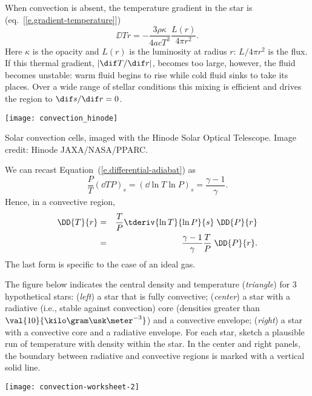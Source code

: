 When convection is absent, the temperature gradient in the star is (eq.~[\ref{e.gradient-temperature}])
\[
    \DD{T}{r} = -\frac{3\rho\kappa}{4acT^3}\frac{L(r)}{4\pi r^2}.
\]
Here $\kappa$ is the opacity and $L(r)$ is the luminosity at radius $r$: $L/4\pi r^2$ is the flux. If this thermal gradient, $|\dif T/\dif r|$, becomes too large, however, the fluid becomes unstable: warm fluid begins to rise while cold fluid sinks to take its places. Over a wide range of stellar conditions this mixing is efficient and drives the region to $\dif s/\dif r = 0$.
\begin{marginfigure}
\texttt{[image: convection\_hinode]}
\caption[Solar convection cells]{\label{f.solar-convection]} Solar convection cells, imaged with the Hinode Solar Optical Telescope. Image credit: Hinode JAXA/NASA/PPARC.}
\end{marginfigure}

We can recast Equation~(\ref{e.differential-adiabat}) as
\begin{equation}
    \frac{P}{T}\left(\dd{T}{P}\right)_s = \left(\dd{\ln T}{\ln P}\right)_s = \frac{\gamma-1}{\gamma}.
\label{e.nabla-adiabat}
\end{equation}
Hence, in a convective region,
\begin{eqnarray}
\DD{T}{r} &=& \frac{T}{P}\tderiv{\ln T}{\ln P}{s}\;\DD{P}{r} \nonumber\\
 &=& \frac{\gamma-1}{\gamma} \frac{T}{P}\; \DD{P}{r}.
\end{eqnarray}
The last form is specific to the case of an ideal gas.

\begin{exercisebox}
The figure below indicates the central density and temperature (\emph{triangle}) for 3 hypothetical stars: (\emph{left}) a star that is fully convective; (\emph{center}) a star with a radiative (i.e., stable against convection) core (densities greater than $\val{10}{\kilo\gram\usk\meter^{-3}}$) and a convective envelope; (\emph{right}) a star with a convective core and a radiative envelope. For each star, sketch a plausible run of temperature with density within the star. In the center and right panels, the boundary between radiative and convective regions is marked with a vertical solid line.

\texttt{[image: convection-worksheet-2]}
\end{exercisebox}

%

